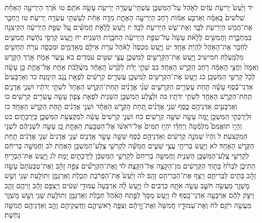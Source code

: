 \documentclass[twoside, openany, parskip=half, 11pt]{book}
\begin{document}
יד וַיַּ֙עַשׂ֙ יְרִיעֹ֣ת עִזִּ֔ים לְאֹ֖הֶל עַל־הַמִּשְׁכָּ֑ן עַשְׁתֵּֽי־עֶשְׂרֵ֥ה יְרִיעֹ֖ת עָשָׂ֥ה אֹתָֽם׃ טו אֹ֜רֶךְ הַיְרִיעָ֣ה הָאַחַ֗ת שְׁלֹשִׁים֙ בָּֽאַמָּ֔ה וְאַרְבַּ֣ע אַמּ֔וֹת רֹ֖חַב הַיְרִיעָ֣ה הָאֶחָ֑ת מִדָּ֣ה אַחַ֔ת לְעַשְׁתֵּ֥י עֶשְׂרֵ֖ה יְרִיעֹֽת׃ טז וַיְחַבֵּ֛ר אֶת־חֲמֵ֥שׁ הַיְרִיעֹ֖ת לְבָ֑ד וְאֶת־שֵׁ֥שׁ הַיְרִיעֹ֖ת לְבָֽד׃ יז וַיַּ֜עַשׂ לֻֽלָאֹ֣ת חֲמִשִּׁ֗ים עַ֚ל שְׂפַ֣ת הַיְרִיעָ֔ה הַקִּיצֹנָ֖ה בַּמַּחְבָּ֑רֶת וַחֲמִשִּׁ֣ים לֻלָאֹ֗ת עָשָׂה֙ עַל־שְׂפַ֣ת הַיְרִיעָ֔ה הַחֹבֶ֖רֶת הַשֵּׁנִֽית׃ יח וַיַּ֛עַשׂ קַרְסֵ֥י נְחֹ֖שֶׁת חֲמִשִּׁ֑ים לְחַבֵּ֥ר אֶת־הָאֹ֖הֶל לִֽהְיֹ֥ת אֶחָֽד׃ יט וַיַּ֤עַשׂ מִכְסֶה֙ לָאֹ֔הֶל עֹרֹ֥ת אֵילִ֖ם מְאׇדָּמִ֑ים וּמִכְסֵ֛ה עֹרֹ֥ת תְּחָשִׁ֖ים מִלְמָֽעְלָה׃
חמישיכ וַיַּ֥עַשׂ אֶת־הַקְּרָשִׁ֖ים לַמִּשְׁכָּ֑ן עֲצֵ֥י שִׁטִּ֖ים עֹמְדִֽים׃ כא עֶ֥שֶׂר אַמֹּ֖ת אֹ֣רֶךְ הַקָּ֑רֶשׁ וְאַמָּה֙ וַחֲצִ֣י הָֽאַמָּ֔ה רֹ֖חַב הַקֶּ֥רֶשׁ הָאֶחָֽד׃ כב שְׁתֵּ֣י יָדֹ֗ת לַקֶּ֙רֶשׁ֙ הָֽאֶחָ֔ד מְשֻׁ֨לָּבֹ֔ת אַחַ֖ת אֶל־אֶחָ֑ת כֵּ֣ן עָשָׂ֔ה לְכֹ֖ל קַרְשֵׁ֥י הַמִּשְׁכָּֽן׃ כג וַיַּ֥עַשׂ אֶת־הַקְּרָשִׁ֖ים לַמִּשְׁכָּ֑ן עֶשְׂרִ֣ים קְרָשִׁ֔ים לִפְאַ֖ת נֶ֥גֶב תֵּימָֽנָה׃ כד וְאַרְבָּעִים֙ אַדְנֵי־כֶ֔סֶף עָשָׂ֕ה תַּ֖חַת עֶשְׂרִ֣ים הַקְּרָשִׁ֑ים שְׁנֵ֨י אֲדָנִ֜ים תַּֽחַת־הַקֶּ֤רֶשׁ הָאֶחָד֙ לִשְׁתֵּ֣י יְדֹתָ֔יו וּשְׁנֵ֧י אֲדָנִ֛ים תַּֽחַת־הַקֶּ֥רֶשׁ הָאֶחָ֖ד לִשְׁתֵּ֥י יְדֹתָֽיו׃ כה וּלְצֶ֧לַע הַמִּשְׁכָּ֛ן הַשֵּׁנִ֖ית לִפְאַ֣ת צָפ֑וֹן עָשָׂ֖ה עֶשְׂרִ֥ים קְרָשִֽׁים׃ כו וְאַרְבָּעִ֥ים אַדְנֵיהֶ֖ם כָּ֑סֶף שְׁנֵ֣י אֲדָנִ֗ים תַּ֚חַת הַקֶּ֣רֶשׁ הָאֶחָ֔ד וּשְׁנֵ֣י אֲדָנִ֔ים תַּ֖חַת הַקֶּ֥רֶשׁ הָאֶחָֽד׃ כז וּֽלְיַרְכְּתֵ֥י הַמִּשְׁכָּ֖ן יָ֑מָּה עָשָׂ֖ה שִׁשָּׁ֥ה קְרָשִֽׁים׃ כח וּשְׁנֵ֤י קְרָשִׁים֙ עָשָׂ֔ה לִמְקֻצְעֹ֖ת הַמִּשְׁכָּ֑ן בַּיַּרְכָתָֽיִם׃ כט וְהָי֣וּ תוֹאֲמִם֮ מִלְּמַ֒טָּה֒ וְיַחְדָּ֗ו יִהְי֤וּ תַמִּים֙ אֶל־רֹאשׁ֔וֹ אֶל־הַטַּבַּ֖עַת הָאֶחָ֑ת כֵּ֚ן עָשָׂ֣ה לִשְׁנֵיהֶ֔ם לִשְׁנֵ֖י הַמִּקְצֹעֹֽת׃ ל וְהָיוּ֙ שְׁמֹנָ֣ה קְרָשִׁ֔ים וְאַדְנֵיהֶ֣ם כֶּ֔סֶף שִׁשָּׁ֥ה עָשָׂ֖ר אֲדָנִ֑ים שְׁנֵ֤י אֲדָנִים֙ שְׁנֵ֣י אֲדָנִ֔ים תַּ֖חַת הַקֶּ֥רֶשׁ הָאֶחָֽד׃ לא וַיַּ֥עַשׂ בְּרִיחֵ֖י עֲצֵ֣י שִׁטִּ֑ים חֲמִשָּׁ֕ה לְקַרְשֵׁ֥י צֶֽלַע־הַמִּשְׁכָּ֖ן הָאֶחָֽת׃ לב וַחֲמִשָּׁ֣ה בְרִיחִ֔ם לְקַרְשֵׁ֥י צֶֽלַע־הַמִּשְׁכָּ֖ן הַשֵּׁנִ֑ית וַחֲמִשָּׁ֤ה בְרִיחִם֙ לְקַרְשֵׁ֣י הַמִּשְׁכָּ֔ן לַיַּרְכָתַ֖יִם יָֽמָּה׃ לג וַיַּ֖עַשׂ אֶת־הַבְּרִ֣יחַ הַתִּיכֹ֑ן לִבְרֹ֙חַ֙ בְּת֣וֹךְ הַקְּרָשִׁ֔ים מִן־הַקָּצֶ֖ה אֶל־הַקָּצֶֽה׃ לד וְֽאֶת־הַקְּרָשִׁ֞ים צִפָּ֣ה זָהָ֗ב וְאֶת־טַבְּעֹתָם֙ עָשָׂ֣ה זָהָ֔ב בָּתִּ֖ים לַבְּרִיחִ֑ם וַיְצַ֥ף אֶת־הַבְּרִיחִ֖ם זָהָֽב׃ לה וַיַּ֙עַשׂ֙ אֶת־הַפָּרֹ֔כֶת תְּכֵ֧לֶת וְאַרְגָּמָ֛ן וְתוֹלַ֥עַת שָׁנִ֖י וְשֵׁ֣שׁ מׇשְׁזָ֑ר מַעֲשֵׂ֥ה חֹשֵׁ֛ב עָשָׂ֥ה אֹתָ֖הּ כְּרֻבִֽים׃ לו וַיַּ֣עַשׂ לָ֗הּ אַרְבָּעָה֙ עַמּוּדֵ֣י שִׁטִּ֔ים וַיְצַפֵּ֣ם זָהָ֔ב וָוֵיהֶ֖ם זָהָ֑ב וַיִּצֹ֣ק לָהֶ֔ם אַרְבָּעָ֖ה אַדְנֵי־כָֽסֶף׃ לז וַיַּ֤עַשׂ מָסָךְ֙ לְפֶ֣תַח הָאֹ֔הֶל תְּכֵ֧לֶת וְאַרְגָּמָ֛ן וְתוֹלַ֥עַת שָׁנִ֖י וְשֵׁ֣שׁ מׇשְׁזָ֑ר מַעֲשֵׂ֖ה רֹקֵֽם׃ לח וְאֶת־עַמּוּדָ֤יו חֲמִשָּׁה֙ וְאֶת־וָ֣וֵיהֶ֔ם וְצִפָּ֧ה רָאשֵׁיהֶ֛ם וַחֲשֻׁקֵיהֶ֖ם זָהָ֑ב וְאַדְנֵיהֶ֥ם חֲמִשָּׁ֖ה נְחֹֽשֶׁת׃
\end{document}
